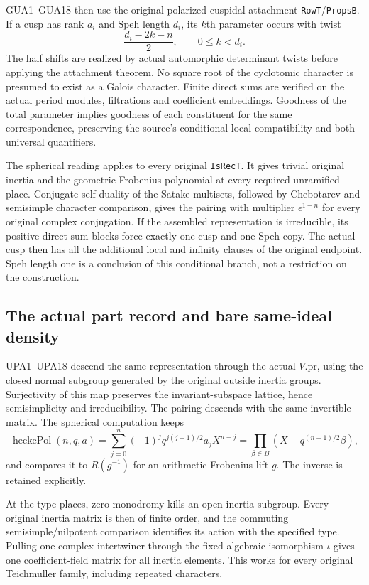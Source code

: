 GUA1--GUA18 then use the original polarized cuspidal attachment
\texttt{Row\allowbreak T}/\texttt{Props\allowbreak B}.  If a cusp has rank $a_i$ and
Speh length $d_i$, its $k$th parameter occurs with twist
\[
                 \frac{d_i-2k-n}{2},\qquad 0\le k<d_i.
\]
The half shifts are realized by actual automorphic determinant
twists before applying the attachment theorem.  No square root of
the cyclotomic character is presumed to exist as a Galois character.
Finite direct sums are verified on the actual period modules,
filtrations and coefficient embeddings.  Goodness of the total
parameter implies goodness of each constituent for the same
correspondence, preserving the source's conditional local
compatibility and both universal quantifiers.

The spherical reading applies to every original \texttt{Is\allowbreak Rec\allowbreak T}.
It gives trivial original inertia and the geometric Frobenius
polynomial at every required unramified place.  Conjugate
self-duality of the Satake multisets, followed by Chebotarev and
semisimple character comparison, gives the pairing with multiplier
$\epsilon^{1-n}$ for every original complex conjugation.
If the assembled representation is irreducible, its positive
direct-sum blocks force exactly one cusp and one Speh copy.  The
actual cusp then has all the additional local and infinity clauses
of the original endpoint.  Speh length one is a conclusion of this
conditional branch, not a restriction on the construction.

\subsection{The actual part record and bare same-ideal density}

UPA1--UPA18 descend the same representation through the actual
$V.\mathrm{pr}$, using the closed normal subgroup generated by
the original outside inertia groups.  Surjectivity of this map
preserves the invariant-subspace lattice, hence semisimplicity and
irreducibility.  The pairing descends with the same invertible
matrix.  The spherical computation keeps
\[
 \operatorname{heckePol}(n,q,a)
   =\sum_{j=0}^n(-1)^jq^{j(j-1)/2}a_jX^{n-j}
   =\prod_{\beta\in B}(X-q^{(n-1)/2}\beta),
\]
and compares it to $R(g^{-1})$ for an arithmetic Frobenius lift
$g$.  The inverse is retained explicitly.

At the type places, zero monodromy kills an open inertia subgroup.
Every original inertia matrix is then of finite order, and the
commuting semisimple/nilpotent comparison identifies its action
with the specified type.  Pulling one complex intertwiner through
the fixed algebraic isomorphism $\iota$ gives one coefficient-field
matrix for all inertia elements.  This works for every original
Teichmuller family, including repeated characters.

